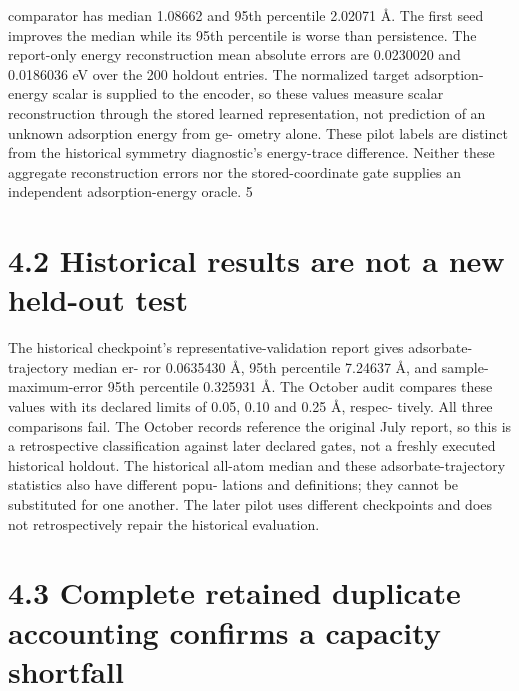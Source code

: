 \documentclass[11pt]{article}
\begin{document}
comparator has median 1.08662 and 95th percentile 2.02071 Å. The first seed improves the median
while its 95th percentile is worse than persistence. The report-only energy reconstruction mean
absolute errors are 0.0230020 and 0.0186036 eV over the 200 holdout entries. The normalized target
adsorption-energy scalar is supplied to the encoder, so these values measure scalar reconstruction
through the stored learned representation, not prediction of an unknown adsorption energy from ge-
ometry alone. These pilot labels are distinct from the historical symmetry diagnostic’s energy-trace
difference. Neither these aggregate reconstruction errors nor the stored-coordinate gate supplies an
independent adsorption-energy oracle.
5


\section*{4.2 Historical results are not a new held-out test}

The historical checkpoint’s representative-validation report gives adsorbate-trajectory median er-
ror 0.0635430 Å, 95th percentile 7.24637 Å, and sample-maximum-error 95th percentile 0.325931 Å.
The October audit compares these values with its declared limits of 0.05, 0.10 and 0.25 Å, respec-
tively. All three comparisons fail. The October records reference the original July report, so this is
a retrospective classification against later declared gates, not a freshly executed historical holdout.
The historical all-atom median and these adsorbate-trajectory statistics also have different popu-
lations and definitions; they cannot be substituted for one another. The later pilot uses different
checkpoints and does not retrospectively repair the historical evaluation.

\section*{4.3 Complete retained duplicate accounting confirms a capacity shortfall}
\end{document}
